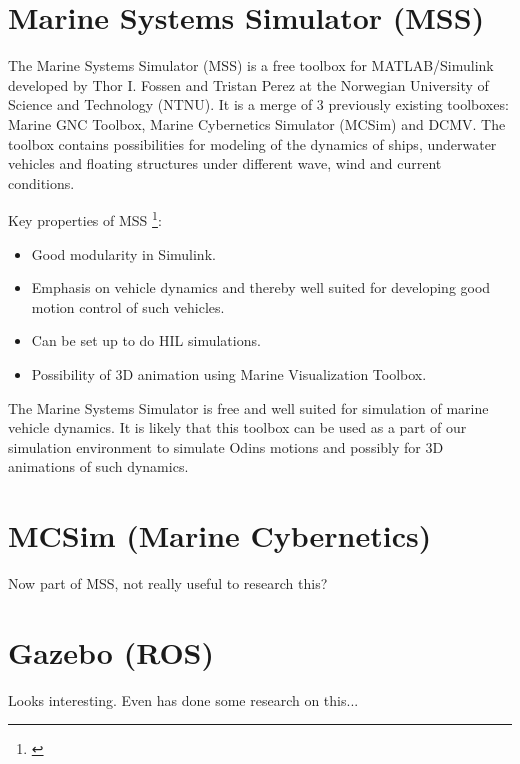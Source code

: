 \section{Marine Systems Simulator (MSS)}
The Marine Systems Simulator (MSS) is a free toolbox for MATLAB/Simulink developed by Thor I. Fossen and Tristan Perez at the Norwegian University of Science and Technology (NTNU). It is a merge of 3 previously existing toolboxes: Marine GNC Toolbox, Marine Cybernetics Simulator (MCSim) and DCMV. The toolbox contains possibilities for modeling of the dynamics of ships, underwater vehicles and floating structures under different wave, wind and current conditions.

Key properties of MSS \footnote{\cite{MSSoverview}}:
\begin{itemize}
\item Good modularity in Simulink.
\item Emphasis on vehicle dynamics and thereby well suited for developing good motion control of such vehicles.
\item Can be set up to do HIL simulations.
\item Possibility of 3D animation using Marine Visualization Toolbox.
\end{itemize}

The Marine Systems Simulator is free and well suited for simulation of marine vehicle dynamics. It is likely that this toolbox can be used as a part of our simulation environment to simulate Odins motions and possibly for 3D animations of such dynamics.

\section{MCSim (Marine Cybernetics)}
Now part of MSS, not really useful to research this?

\section{Gazebo (ROS)}
Looks interesting. Even has done some research on this...


